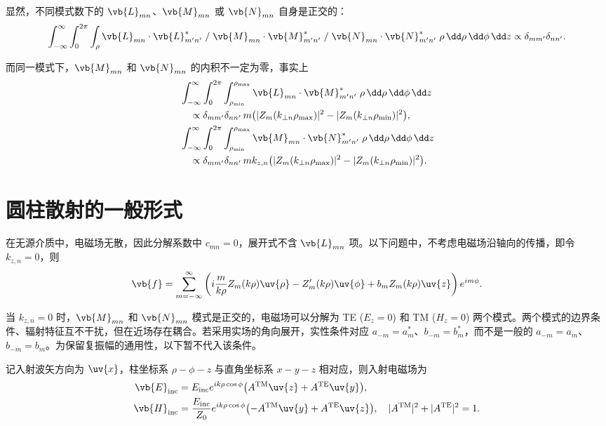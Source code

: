 显然，不同模式数下的 \(\vb{L}_{mn}\)、\(\vb{M}_{mn}\) 或 \(\vb{N}_{mn}\) 自身是正交的：
\begin{align*}
	\int_{-\infty}^{\infty} \int_0^{2\pi} \int_\rho \vb{L}_{mn} \cdot \vb{L}_{m'n'}^* \;/\; \vb{M}_{mn} \cdot \vb{M}_{m'n'}^* \;/\; \vb{N}_{mn} \cdot \vb{N}_{m'n'}^* \; \rho \,\dd \rho \,\dd \phi \,\dd z \propto \delta_{mm'}\delta_{nn'}.
\end{align*}

而同一模式下，\(\vb{M}_{mn}\) 和 \(\vb{N}_{mn}\) 的内积不一定为零，事实上
\begin{align*}
	 & \int_{-\infty}^{\infty} \int_0^{2\pi} \int_{\rho_{\min}}^{\rho_{\max}} \vb{L}_{mn} \cdot \vb{M}_{m'n'}^* \; \rho \,\dd \rho \,\dd \phi \,\dd z \\
	 & \quad \propto \delta_{mm'}\delta_{nn'} \, m \bigl( |Z_m(k_{\perp n}\rho_{\max})|^2 - |Z_m(k_{\perp n}\rho_{\min})|^2 \bigr),                \\
	 & \int_{-\infty}^{\infty} \int_0^{2\pi} \int_{\rho_{\min}}^{\rho_{\max}} \vb{M}_{mn} \cdot \vb{N}_{m'n'}^* \; \rho \,\dd \rho \,\dd \phi \,\dd z \\
	 & \quad \propto \delta_{mm'}\delta_{nn'} \, m k_{z,n} \bigl( |Z_m(k_{\perp n}\rho_{\max})|^2 - |Z_m(k_{\perp n}\rho_{\min})|^2 \bigr).
\end{align*}

\section{圆柱散射的一般形式}
在无源介质中，电磁场无散，因此分解系数中 \(c_{mn} = 0\)，展开式不含 \(\vb{L}_{mn}\) 项。以下问题中，不考虑电磁场沿轴向的传播，即令 \(k_{z,n} = 0\)，则
\begin{align*}
	\vb{f} = \sum_{m=-\infty}^{\infty} \left( i\frac{m}{k\rho} Z_m(k\rho) \uv{\rho} - Z_m'(k\rho) \uv{\phi} + b_m Z_m(k\rho) \uv{z} \right) e^{im\phi}.
\end{align*}

	当 \(k_{z,n} = 0\) 时，\(\vb{M}_{mn}\) 和 \(\vb{N}_{mn}\) 模式是正交的，电磁场可以分解为 TE (\(E_z = 0\)) 和 TM (\(H_z = 0\)) 两个模式。两个模式的边界条件、辐射特征互不干扰，但在近场存在耦合。若采用实场的角向展开，实性条件对应 \(a_{-m}=a_m^*\)、\(b_{-m}=b_m^*\)，而不是一般的 \(a_{-m}=a_m\)、\(b_{-m}=b_m\)。为保留复振幅的通用性，以下暂不代入该条件。

记入射波矢方向为 \(\uv{x}\)，柱坐标系 \(\rho\!-\!\phi\!-\!z\) 与直角坐标系 \(x\!-\!y\!-\!z\) 相对应，则入射电磁场为
\begin{align*}
	\vb{E}_{\rm inc} & = E_{\rm inc} e^{ik\rho\cos\phi} \bigl( A^{\rm TM} \uv{z} + A^{\rm TE} \uv{y} \bigr),                    \\
	\vb{H}_{\rm inc} & = \frac{E_{\rm inc}}{Z_0} e^{ik\rho\cos\phi} \bigl( -A^{\rm TM} \uv{y} + A^{\rm TE} \uv{z} \bigr), \quad
	|A^{\rm TM}|^2 + |A^{\rm TE}|^2 = 1.
\end{align*}

